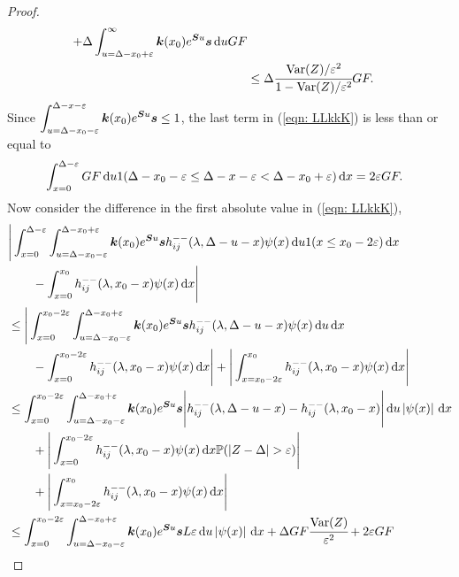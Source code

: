 \begin{proof}
\begin{align}
		+ \Delta \int_{u=\Delta-x_0+\varepsilon}^{\infty} \boldsymbol k(x_0)e^{\boldsymbol Su}\boldsymbol s  \, \mathrm{d} u GF \nonumber
		\\&\leq \Delta \cfrac{\mathrm{Var}(Z)/\varepsilon^2}{1-\mathrm{Var}(Z)/\varepsilon^2}GF. \label{eqn:aaAAAAd}
	\end{align}
	Since \(\displaystyle \int_{u=\Delta-x_0-\varepsilon}^{\Delta-x-\varepsilon} \boldsymbol k(x_0)e^{\boldsymbol Su}\boldsymbol s \leq 1\), the last term in (\ref{eqn: LLkkK}) is less than or equal to 
	\begin{align}
		&\int_{x=0}^{\Delta-\varepsilon}GF \, \mathrm{d} u 
		 1(\Delta-x_0-\varepsilon\leq \Delta - x -\varepsilon < \Delta-x_0+\varepsilon)\, \mathrm{d} x =2\varepsilon GF. \label{eqn:Qwe}
	\end{align}
	Now consider the difference in the first absolute value in (\ref{eqn: LLkkK}),
	\begin{align}
		&\Bigg|\int_{x=0}^{\Delta-\varepsilon}\int_{u=\Delta-x_0-\varepsilon}^{\Delta-x_0+\varepsilon} \bs k(x_0)e^{\bs Su}\bs s h_{ij}^{--}(\lambda, \Delta - u - x) \psi(x) \wrt u 1(x\leq x_0-2\varepsilon) \wrt x \nonumber
		\\&{}\qquad {} - \int_{x=0}^{x_0} h_{ij}^{--}(\lambda, x_0 - x)\psi(x)\wrt x \Bigg|\nonumber
		\\&\leq \Bigg|\int_{x=0}^{ x_0-2\varepsilon }\int_{u=\Delta-x_0-\varepsilon}^{\Delta-x_0+\varepsilon} \bs k(x_0)e^{\bs Su}\bs s h_{ij}^{--}(\lambda, \Delta - u - x) \psi(x) \wrt u  \wrt x \nonumber
		\\&{}\qquad {} - \int_{x=0}^{x_0-2\varepsilon} h_{ij}^{--}(\lambda, x_0 - x)\psi(x)\wrt x\Bigg| + \Bigg| \int_{x=x_0-2\varepsilon}^{x_0} h_{ij}^{--}(\lambda, x_0 - x)\psi(x)\wrt x\Bigg| \nonumber
		\\&\leq  \int_{x=0}^{ x_0-2\varepsilon }\int_{u=\Delta-x_0-\varepsilon}^{\Delta-x_0+\varepsilon} \bs k(x_0)e^{\bs Su}\bs s \Bigg| h_{ij}^{--}(\lambda, \Delta - u - x) - h_{ij}^{--}(\lambda, x_0 - x) \Bigg| \wrt u \left|\psi(x)\right| \wrt x  \nonumber
		\\&{}\qquad {} + \Bigg| \int_{x=0}^{x_0-2\varepsilon} h_{ij}^{--}(\lambda, x_0 - x)\psi(x) \wrt x \mathbb P(|Z-\Delta|>\varepsilon)\Bigg| \nonumber 
		\\&\qquad{} + \Bigg|\int_{x=x_0-2\varepsilon}^{x_0} h_{ij}^{--}(\lambda, x_0 - x)\psi(x)\wrt x \Bigg| \nonumber
		\\&\leq \int_{x=0}^{ x_0-2\varepsilon }\int_{u=\Delta-x_0-\varepsilon}^{\Delta-x_0+\varepsilon} \bs k(x_0)e^{\bs Su}\bs s L\varepsilon  \wrt u \left|\psi(x)\right| \wrt x \nonumber
		+\Delta GF \cfrac{\var(Z)}{\varepsilon^2} + 2\varepsilon GF

\end{align}
\end{proof}

